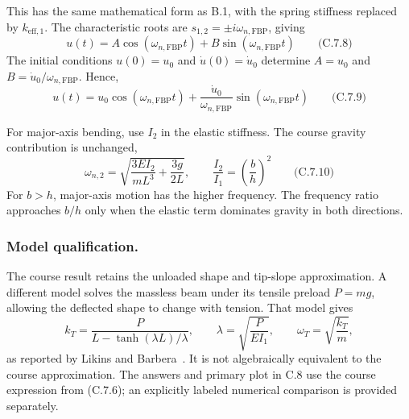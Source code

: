 This has the same mathematical form as B.1, with the spring stiffness replaced by \(k_{\mathrm{eff},1}\). The characteristic roots are \(s_{1,2}=\pm i\omega_{n,\mathrm{FBP}}\), giving
\[
\boxed{u(t)=A\cos(\omega_{n,\mathrm{FBP}}t)
+B\sin(\omega_{n,\mathrm{FBP}}t)}
\qquad\text{(C.7.8)}
\]
The initial conditions \(u(0)=u_0\) and \(\dot u(0)=\dot u_0\) determine \(A=u_0\) and \(B=\dot u_0/\omega_{n,\mathrm{FBP}}\). Hence,
\[
\boxed{u(t)=u_0\cos(\omega_{n,\mathrm{FBP}}t)
+\frac{\dot u_0}{\omega_{n,\mathrm{FBP}}}
\sin(\omega_{n,\mathrm{FBP}}t)}
\qquad\text{(C.7.9)}
\]

For major-axis bending, use \(I_2\) in the elastic stiffness. The course gravity contribution is unchanged,
\[
\boxed{\omega_{n,2}=\sqrt{\frac{3EI_2}{mL^3}+\frac{3g}{2L}},
\qquad \frac{I_2}{I_1}=\left(\frac{b}{h}\right)^2}
\qquad\text{(C.7.10)}
\]
For \(b>h\), major-axis motion has the higher frequency. The frequency ratio approaches \(b/h\) only when the elastic term dominates gravity in both directions.

\subsubsection*{Model qualification.}
The course result retains the unloaded shape and tip-slope approximation. A different model solves the massless beam under its tensile preload \(P=mg\), allowing the deflected shape to change with tension. That model gives
\[
k_T=\frac{P}{L-\tanh(\lambda L)/\lambda},
\qquad \lambda=\sqrt{\frac{P}{EI_1}},\qquad
\omega_T=\sqrt{\frac{k_T}{m}},
\]
as reported by Likins and Barbera~\cite{Likins1971Spacecraft}. It is not algebraically equivalent to the course approximation. The answers and primary plot in C.8 use the course expression from (C.7.6); an explicitly labeled numerical comparison is provided separately.
